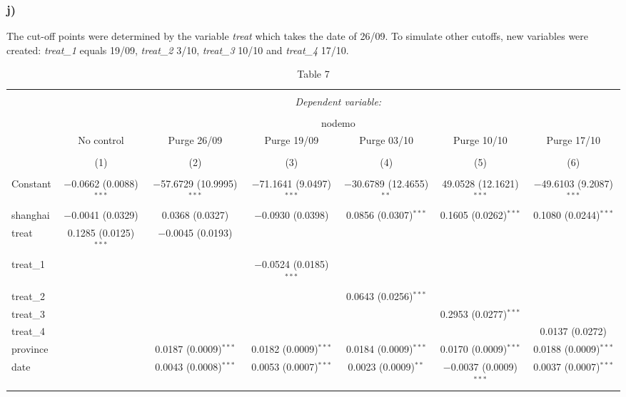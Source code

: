 \documentclass[
]{article}
\begin{document}
\hypertarget{j}{%
\subsubsection{j)}\label{j}}

The cut-off points were determined by the variable \emph{treat} which
takes the date of 26/09. To simulate other cutoffs, new variables were
created: \emph{treat\_1} equals 19/09, \emph{treat\_2} 3/10,
\emph{treat\_3} 10/10 and \emph{treat\_4} 17/10.

\begin{table}[!htbp] \centering 
  \caption{Table 7} 
  \label{} 
\small 
\begin{tabular}{@{\extracolsep{5pt}}lcccccc} 
\\[-1.8ex]\hline 
\hline \\[-1.8ex] 
 & \multicolumn{6}{c}{\textit{Dependent variable:}} \\ 
\cline{2-7} 
\\[-1.8ex] & \multicolumn{6}{c}{nodemo} \\ 
 & No control & Purge 26/09 & Purge 19/09 & Purge 03/10 & Purge 10/10 & Purge 17/10 \\ 
\\[-1.8ex] & (1) & (2) & (3) & (4) & (5) & (6)\\ 
\hline \\[-1.8ex] 
 Constant & $-$0.0662 (0.0088)$^{***}$ & $-$57.6729 (10.9995)$^{***}$ & $-$71.1641 (9.0497)$^{***}$ & $-$30.6789 (12.4655)$^{**}$ & 49.0528 (12.1621)$^{***}$ & $-$49.6103 (9.2087)$^{***}$ \\ 
  shanghai & $-$0.0041 (0.0329) & 0.0368 (0.0327) & $-$0.0930 (0.0398) & 0.0856 (0.0307)$^{***}$ & 0.1605 (0.0262)$^{***}$ & 0.1080 (0.0244)$^{***}$ \\ 
  treat & 0.1285 (0.0125)$^{***}$ & $-$0.0045 (0.0193) &  &  &  &  \\ 
  treat\_1 &  &  & $-$0.0524 (0.0185)$^{***}$ &  &  &  \\ 
  treat\_2 &  &  &  & 0.0643 (0.0256)$^{***}$ &  &  \\ 
  treat\_3 &  &  &  &  & 0.2953 (0.0277)$^{***}$ &  \\ 
  treat\_4 &  &  &  &  &  & 0.0137 (0.0272) \\ 
  province &  & 0.0187 (0.0009)$^{***}$ & 0.0182 (0.0009)$^{***}$ & 0.0184 (0.0009)$^{***}$ & 0.0170 (0.0009)$^{***}$ & 0.0188 (0.0009)$^{***}$ \\ 
  date &  & 0.0043 (0.0008)$^{***}$ & 0.0053 (0.0007)$^{***}$ & 0.0023 (0.0009)$^{**}$ & $-$0.0037 (0.0009)$^{***}$ & 0.0037 (0.0007)$^{***}$ \\ 

\end{tabular}
\end{table}
\end{document}
